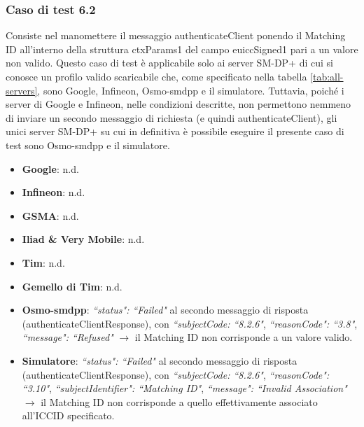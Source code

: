\documentclass[10pt, oneside]{book}
\begin{document}
\subsubsection{Caso di test 6.2}
Consiste nel manomettere il messaggio authenticateClient ponendo il Matching ID all'interno della struttura ctxParams1 del campo euiccSigned1 pari a un valore non valido. Questo caso di test è applicabile solo ai server SM-DP+ di cui si conosce un profilo valido scaricabile che, come specificato nella tabella \ref{tab:all-servers}, sono Google, Infineon, Osmo-smdpp e il simulatore. Tuttavia, poiché i server di Google e Infineon, nelle condizioni descritte, non permettono nemmeno di inviare un secondo messaggio di richiesta (e quindi authenticateClient), gli unici server SM-DP+ su cui in definitiva è possibile eseguire il presente caso di test sono Osmo-smdpp e il simulatore.
\begin{itemize}
\item \textbf{Google}: n.d.
\item \textbf{Infineon}: n.d.
\item \textbf{GSMA}: n.d.
\item \textbf{Iliad \& Very Mobile}: n.d.
\item \textbf{Tim}: n.d.
\item \textbf{Gemello di Tim}: n.d.
\item \textbf{Osmo-smdpp}: \textit{``status": ``Failed"} al secondo messaggio di risposta (authenticateClientResponse), con \textit{``subjectCode: ``8.2.6"}, \textit{``reasonCode": ``3.8"}, \textit{``message": ``Refused"} $\rightarrow$ il Matching ID non corrisponde a un valore valido.
\item \textbf{Simulatore}: \textit{``status": ``Failed"} al secondo messaggio di risposta (authenticateClientResponse), con \textit{``subjectCode: ``8.2.6"}, \textit{``reasonCode": ``3.10"}, \textit{``subjectIdentifier": ``Matching ID"}, \textit{``message": ``Invalid Association"} $\rightarrow$ il Matching ID non corrisponde a quello effettivamente associato all'ICCID specificato.
\end{itemize}
\end{document}
